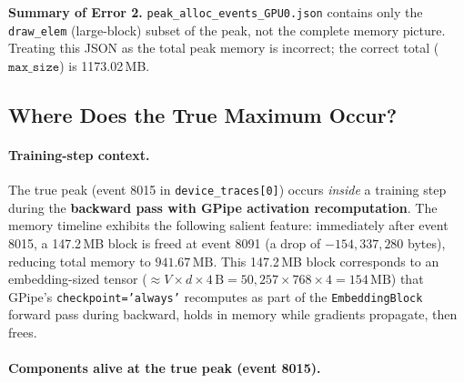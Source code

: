 \documentclass[11pt,a4paper]{article}
\begin{document}
\begin{bugbox}
\textbf{Summary of Error 2.}
\texttt{peak\_alloc\_events\_GPU0.json} contains only the
\texttt{draw\_elem} (large-block) subset of the peak, not the
complete memory picture.  Treating this JSON as the total peak memory is
incorrect; the correct total ($\mathtt{max\_size}$) is 1173.02\,MB.
\end{bugbox}

\subsection{Where Does the True Maximum Occur?}
\label{sec:wheremax}

\paragraph{Training-step context.}
The true peak (event 8015 in \texttt{device\_traces[0]}) occurs
\emph{inside} a training step during the \textbf{backward pass with
GPipe activation recomputation}.  The memory timeline exhibits the following
salient feature: immediately after event 8015, a 147.2\,MB block is freed
at event 8091 (a drop of $-154{,}337{,}280$ bytes), reducing total memory to
$941.67\,\text{MB}$.  This 147.2\,MB block corresponds to an
embedding-sized tensor ($\approx V \times d \times 4\,\text{B}
= 50{,}257 \times 768 \times 4 = 154\,\text{MB}$) that GPipe's
\texttt{checkpoint='always'} recomputes as part of the
\texttt{EmbeddingBlock} forward pass during backward, holds in memory
while gradients propagate, then frees.

\paragraph{Components alive at the true peak (event 8015).}
\end{document}
